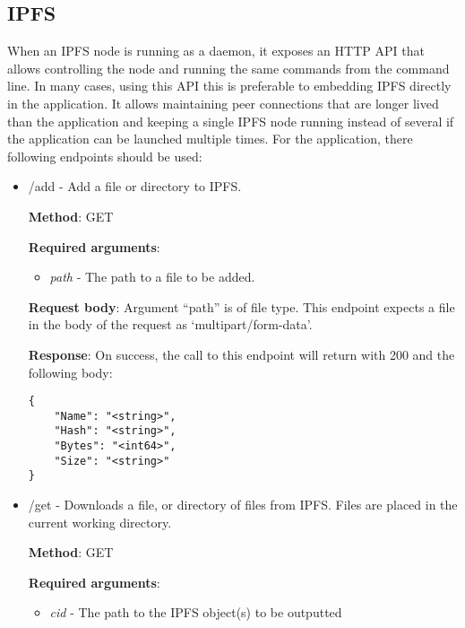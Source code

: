 \documentclass[12pt]{report}
\begin{document}
\subsection{IPFS}

When an IPFS node is running as a daemon, it exposes an HTTP API that allows controlling the node and running the same commands from the command line. In many cases, using this API this is preferable to embedding IPFS directly in the application. It allows maintaining peer connections that are longer lived than the application and keeping a single IPFS node running instead of several if the application can be launched multiple times. For the application, there following endpoints should be used:

\begin{itemize}
\item {\ttfamily /add} - Add a file or directory to IPFS.

\textbf{Method}: GET

\textbf{Required arguments}: 

\begin{itemize}
\item \textit{path} - The path to a file to be added.
\end{itemize}

\textbf{Request body}: Argument “path” is of file type. This endpoint expects a file in the body of the request as ‘multipart/form-data’.

\textbf{Response}: On success, the call to this endpoint will return with 200 and the following body:

\begin{lstlisting}
{
    "Name": "<string>",
    "Hash": "<string>",
    "Bytes": "<int64>",
    "Size": "<string>"
}
\end{lstlisting}


\item {\ttfamily /get} - Downloads a file, or directory of files from IPFS. Files are placed in the current working directory.

\textbf{Method}: GET

\textbf{Required arguments}: 

\begin{itemize}
\item \textit{cid} - The path to the IPFS object(s) to be outputted
\end{itemize}


\end{itemize}
\end{document}
